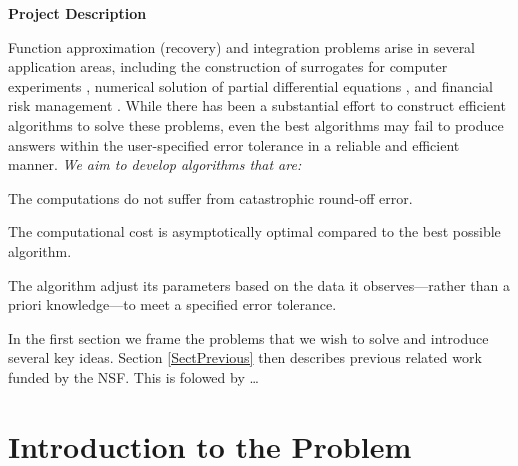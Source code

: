 \documentclass[11pt]{NSFamsart}
\begin{document}

\centerline{\Large \bf Project Description}

Function approximation (recovery) and integration problems arise in several application areas, including the construction of surrogates for computer experiments \citep{ForEtal09}, numerical solution of partial differential equations \citep{Fas07a,SchWen06a}, and financial risk management \citep{Gla03}.  While there has been a substantial effort to construct efficient algorithms to solve these problems, even the best algorithms may fail to produce answers within the user-specified error tolerance in a reliable and efficient manner.  \emph{We aim to develop algorithms that are:}
\begin{description}[leftmargin=2.5ex]
\item[Stable] The computations do not suffer from catastrophic round-off error.

\item[Efficient] The computational cost is asymptotically optimal compared to the best possible algorithm.

\item[Adaptive] The algorithm adjust its parameters based on the data it observes---rather than a priori knowledge---to meet a specified error tolerance. 
\end{description}

In the first section we frame the problems that we wish to solve and introduce several key ideas.  Section \ref{SectPrevious} then describes previous related work funded by the NSF. This is folowed by \ldots

\section{Introduction to the Problem}
\end{document}

